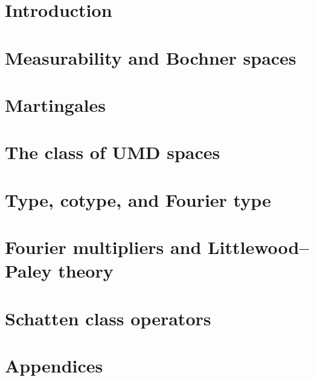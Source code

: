 \documentclass[a4paper,10pt,intlimits,sumlimits]{amsart}
\begin{document}


\maketitle
\footnotesize
\tableofcontents
\normalsize

\section{Introduction}
\label{sec:intro}


\section{Measurability and Bochner spaces}
\label{sec:Bochner-spaces}


\section{Martingales}
\label{sec:martingales} 


\section{The class of UMD spaces}
\label{sec:UMD}


\section{Type, cotype, and Fourier type}
\label{sec:type}


\section{Fourier multipliers and Littlewood--Paley theory}
\label{sec:HT}


\section{Schatten class operators}
\label{sec:schatten}


\section{Appendices}
\label{sec:appendices}





\printbibliography

% 
%  
\end{document}
